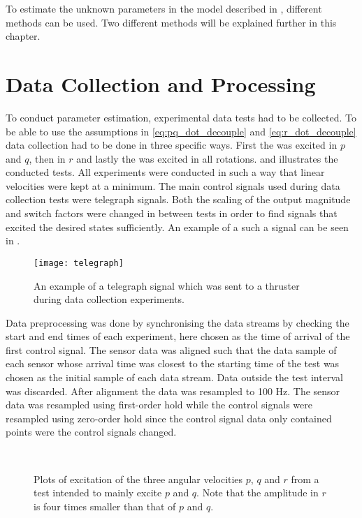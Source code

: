 To estimate the unknown parameters in the \abbrROV model described in , different methods can be used. Two different methods will be explained further in this chapter.  
\section{Data Collection and Processing}  
To conduct parameter estimation, experimental data tests had to be collected. To be able to use the assumptions in \eqref{eq:pq_dot_decouple} and \eqref{eq:r_dot_decouple} data collection had to be done in three specific ways.
First the \abbrROV was excited in $p$ and $q$, then in $r$ and lastly the \abbrROV was excited in all rotations.  and  illustrates the conducted tests. All experiments were conducted in such a way that linear velocities were kept at a minimum.
The main control signals used during data collection tests were telegraph signals. Both the scaling of the output magnitude and switch factors were changed in between tests in order to find signals that excited the desired states sufficiently. An example of a such a signal can be seen in .

\begin{figure}[htbp]
\centering
\texttt{[image: telegraph]}
\caption{An example of a telegraph signal which was sent to a thruster during data collection experiments.}
\label{fig:telegraph}
\end{figure}

Data preprocessing was done by synchronising the data streams by checking the start and end times of each experiment, here chosen as the time of arrival of the first control signal. The sensor data was aligned such that the data sample of each sensor whose arrival time was closest to the starting time of the test was chosen as the initial sample of each data stream. Data outside the test interval was discarded. After alignment the data was resampled to 100 Hz. The sensor data was resampled using first-order hold while the control signals were resampled using zero-order hold since the control signal data only contained points were the control signals changed.  

\begin{figure}[htbp]
  \centering
  \qquad
  \\
  \caption{\label{fig:pqTest}%
 Plots of excitation of the three angular velocities $p$, $q$ and $r$ from a test intended to mainly excite $p$ and $q$. Note that the amplitude in $r$ is four times smaller than that of $p$ and $q$.}
\end{figure}

